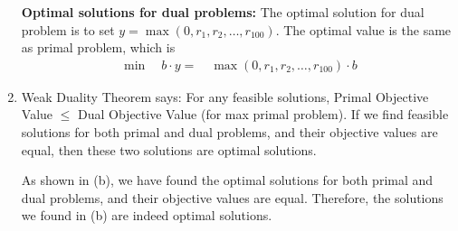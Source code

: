 \documentclass[12pt]{article}
\begin{document}
\begin{enumerate}[label= (\alph*), leftmargin=2em]
\textbf{Optimal solutions for dual problems:}
The optimal solution for dual problem is to set $y = \max(0, r_1, r_2, \ldots, r_{100})$. The optimal value is the same as primal problem, which is 
\begin{align*}
    \min \quad b\cdot y = \quad \max (0, r_1, r_2, \ldots, r_{100}) \cdot b
\end{align*}

\item Weak Duality Theorem says: For any feasible solutions, Primal Objective Value $\leq$ Dual Objective Value (for max primal problem). If we find feasible solutions for both primal and dual problems, and their objective values are equal, then these two solutions are optimal solutions.

As shown in (b), we have found the optimal solutions for both primal and dual problems, and their objective values are equal. Therefore, the solutions we found in (b) are indeed optimal solutions.
\end{enumerate}
\end{document}
